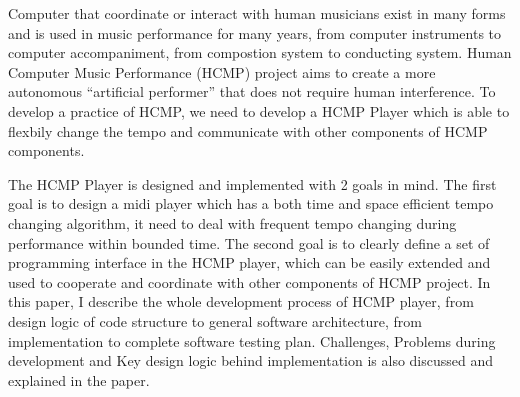


\begin{abstracts}
Computer that coordinate or interact with human 
musicians exist in many forms
and is used in music performance for many years, from  
computer instruments to computer accompaniment, from compostion system 
to conducting system.
Human Computer Music Performance (HCMP) 
project aims to create a more autonomous ``artificial performer''    
that does not require human interference. To develop a practice of
HCMP, we need to develop a HCMP Player which is able to flexbily 
change the tempo and communicate with other components of HCMP components. 

The HCMP Player is designed and implemented with 2 goals in mind. The first
goal is to design a midi player which has a both time and space efficient tempo 
changing algorithm, it need to deal with frequent tempo changing during 
performance within bounded time. The second goal is to clearly define a set of 
programming interface in the HCMP player, which can be easily extended 
and used to cooperate and coordinate with other components of HCMP project.
In this paper, I describe the whole development process of HCMP player, 
from design logic of code structure to general software architecture, 
from implementation to complete software testing plan. Challenges, Problems 
during development and Key design logic 
behind implementation is also discussed and explained in the paper.

\end{abstracts}
